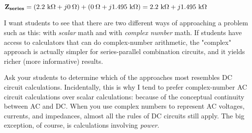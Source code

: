 ${\bf Z_{series}} = (2.2 \hbox{ k}\Omega + j0 \> \Omega) + (0 \> \Omega + j1.495 \hbox{ k}\Omega) = 2.2 \hbox{ k}\Omega + j1.495 \hbox{ k}\Omega$







I want students to see that there are two different ways of approaching a problem such as this: with {\it scalar} math and with {\it complex number} math.  If students have access to calculators that can do complex-number arithmetic, the "complex" approach is actually simpler for series-parallel combination circuits, and it yields richer (more informative) results.

Ask your students to determine which of the approaches most resembles DC circuit calculations.  Incidentally, this is why I tend to prefer complex-number AC circuit calculations over scalar calculations: because of the conceptual continuity between AC and DC.  When you use complex numbers to represent AC voltages, currents, and impedances, almost all the rules of DC circuits still apply.  The big exception, of course, is calculations involving {\it power}.




